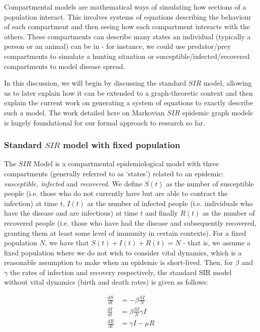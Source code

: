\documentclass[../report.tex]{subfiles}
\begin{document}
Compartmental models are mathematical ways of simulating how sections of a population interact. This involves systems of equations describing the behaviour of each compartment and then seeing how each compartment interacts with the others. These compartments can describe many states an individual (typically a person or an animal) can be in - for instance, we could use predator/prey compartments to simulate a hunting situation or susceptible/infected/recovered compartments to model disease spread. 

In this discussion, we will begin by discussing the standard $SIR$ model, allowing us to later explain how it can be extended to a graph-theoretic context and then explain the current work on generating a system of equations to exactly describe such a model. The work detailed here on Markovian $SIR$ epidemic graph models is hugely foundational for our formal approach to research so far.

\subsubsection{Standard $SIR$ model with fixed population}

The $SIR$ Model is a compartmental epidemiological model with three compartments (generally referred to as `states') related to an epidemic: {\it susceptible, infected} and {\it recovered.} We define $S(t)$ as the number of susceptible people (i.e. those who do not currently have but are able to contract the infection) at time $t$, $I(t)$ as the number of infected people (i.e. individuals who have the disease and are infectious) at time $t$ and finally $R(t)$ as the number of recovered people (i.e. those who have had the disease and subsequently recovered, granting them at least some level of immunity in certain contexts). For a fixed population $N$, we have that $S(t) + I(t) + R(t) = N$ - that is, we assume a fixed population where we do not wish to consider vital dynamics, which is a reasonable assumption to make when an epidemic is short-lived. Then, for $\beta$ and $\gamma$ the rates of infection and recovery respectively, the standard SIR model without vital dynamics (birth and death rates) is given as follows:

\begin{align}
\frac{dS}{dt} & = -\beta \frac{SI}{N} \label{dS}\\
\frac{dI}{dt} & = \beta\frac{SI}{N} \gamma I \label{dI}\\
\frac{dR}{dt} & = \gamma I - \mu R \label{dR}
\end{align}
\end{document}
